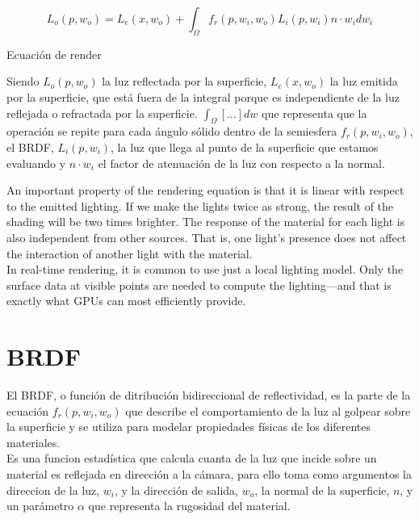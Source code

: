 \begin{eqfloat}[!htb]
    \begin{equation}
        L_o(p, w_o) = L_e(x, w_o) + \int_\Omega{f_r(p, w_i, w_o) L_i(p, w_i) n\cdot{w_i}dw_i}
    \end{equation}
  \caption{Ecuaci\'on de render}
\end{eqfloat}
\singlespacing

Siendo $L_o(p, w_o)$ la luz reflectada por la superficie, $L_e(x, w_o)$ la luz emitida por la superficie, que est\'a fuera
de la integral porque es independiente de la luz reflejada o refractada por la superficie. $\int_{\Omega}[...]dw$ que representa
que la operaci\'on se repite para cada \'angulo s\'olido dentro de la semiesfera $f_r(p, w_i, w_o)$, el BRDF, $L_i(p, w_i)$, la luz
que llega al punto de la superficie que estamos evaluando y $n\cdot{w_i}$ el factor de atenuaci\'on de la luz con respecto a la normal.

An important property of the rendering equation is that it is linear with respect to
the emitted lighting. If we make the lights twice as strong, the result of the shading will
be two times brighter. The response of the material for each light is also independent
from other sources. That is, one light’s presence does not affect the interaction of
another light with the material.\\

In real-time rendering, it is common to use just a local lighting model. Only the
surface data at visible points are needed to compute the lighting—and that is exactly
what GPUs can most efficiently provide.\\

\section{BRDF}

El BRDF, o función de ditribuci\'on bidireccional de reflectividad, es la parte de la ecuaci\'on $f_r(p, w_i, w_o)$ que describe el
comportamiento de la luz al golpear sobre la superficie y se utiliza para modelar propiedades f\'isicas de los diferentes
materiales.\\

Es una funcion estad\'istica que calcula cuanta de la luz que incide sobre un material es reflejada en direcci\'on
a la c\'amara, para ello toma como argumentos la direccion de la luz, $w_i$, y la dirección de salida,
$w_o$, la normal de la superficie, $n$, y un par\'ametro $\alpha$ que representa la rugosidad del material.

